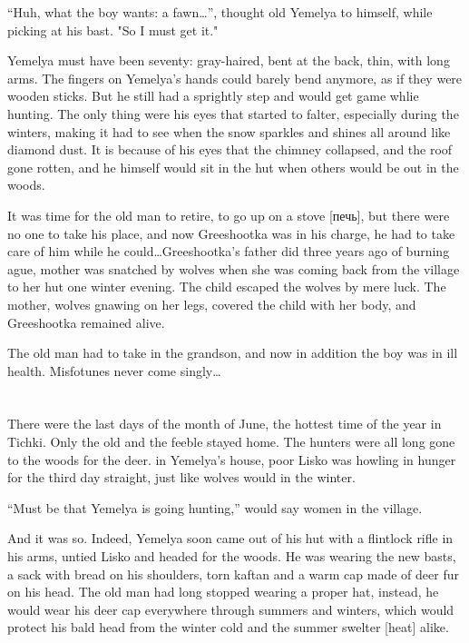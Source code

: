 \documentclass[b5paper,12pt,openany]{book}
\begin{document}
``Huh, what the boy wants: a fawn\ldots'', thought old Yemelya to himself, while picking at his bast. "So I must get it."

Yemelya must have been seventy: gray-haired, bent at the back, thin, with long arms. The fingers on Yemelya's hands could barely bend anymore, as if they were wooden sticks. But he still had a sprightly step and would get game whlie hunting. The only thing were his eyes that started to falter, especially during the winters, making it had to see when the snow sparkles and shines all around like diamond dust. It is because of his eyes that the chimney collapsed, and the roof gone rotten, and he himself would sit in the hut when others would be out in the woods.

It was time for the old man to retire, to go up on a stove [печь], but there were no one to take his place, and now Greeshootka was in his charge, he had to take care of him while he could\ldots Greeshootka's father did three years ago of burning ague, mother was snatched by wolves when she was coming back from the village to her hut one winter evening. The child escaped the wolves by mere luck. The mother, wolves gnawing on her legs, covered the child with her body, and Greeshootka remained alive.

The old man had to take in the grandson, and now in addition the boy was in ill health. Misfotunes never come singly\ldots

\section{}

There were the last days of the month of June, the hottest time of the year in Tichki. Only the old and the feeble stayed home. The hunters were all long gone to the woods for the deer. in Yemelya's house, poor Lisko was howling in hunger for the third day straight, just like wolves would in the winter.

``Must be that Yemelya is going hunting,'' would say women in the village.

And it was so. Indeed, Yemelya soon came out of his hut with a flintlock rifle in his arms, untied Lisko and headed for the woods. He was wearing the new basts, a sack with bread on his shoulders, torn kaftan and a warm cap made of deer fur on his head. The old man had long stopped wearing a proper hat, instead, he would wear his deer cap everywhere through summers and winters, which would protect his bald head from the winter cold and the summer swelter [heat] alike.
\end{document}
